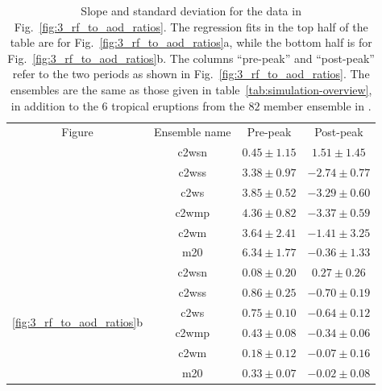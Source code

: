 \documentclass{ametsocV6.1}
\begin{document}
\begin{table}
  \centering

  \caption{Slope and standard deviation for the data in Fig.~\ref{fig:3_rf_to_aod_ratios}.
    The regression fits in the top half of the table are for
    Fig.~\ref{fig:3_rf_to_aod_ratios}a, while the bottom half is for
    Fig.~\ref{fig:3_rf_to_aod_ratios}b. The columns ``pre-peak'' and ``post-peak'' refer to
    the two periods as shown in Fig.~\ref{fig:3_rf_to_aod_ratios}. The ensembles are the
    same as those given in table~\ref{tab:simulation-overview}, in addition to the \(6\)
    tropical eruptions from the \(82\) member ensemble in
    \citet{marshall2020}.}\label{tab:slope-gradients}%
  \begin{tabular}{cccc}
    Figure                                           & Ensemble name & Pre-peak        & Post-peak        \\
    \rowcolor{LightGray}                             & \gls{c2wsn}   & \(0.45\pm1.15\) & \(1.51\pm1.45\)  \\
    \rowcolor{LightGray}                             & \gls{c2wss}   & \(3.38\pm0.97\) & \(-2.74\pm0.77\) \\
    \rowcolor{LightGray}                             & \gls{c2ws}    & \(3.85\pm0.52\) & \(-3.29\pm0.60\) \\
    \rowcolor{LightGray}                             & \gls{c2wmp}   & \(4.36\pm0.82\) & \(-3.37\pm0.59\) \\
    \rowcolor{LightGray}                             & \gls{c2wm}    & \(3.64\pm2.41\) & \(-1.41\pm3.25\) \\
    \rowcolor{LightGray}                             & \gls{m20}     & \(6.34\pm1.77\) & \(-0.36\pm1.33\) \\
    \multirow{6}{*}{\ref{fig:3_rf_to_aod_ratios}b}   & \gls{c2wsn}   & \(0.08\pm0.20\) & \(0.27\pm0.26\)  \\
    \multirow{-10}{*}{\ref{fig:3_rf_to_aod_ratios}a} & \gls{c2wss}   & \(0.86\pm0.25\) & \(-0.70\pm0.19\) \\
                                                     & \gls{c2ws}    & \(0.75\pm0.10\) & \(-0.64\pm0.12\) \\
                                                     & \gls{c2wmp}   & \(0.43\pm0.08\) & \(-0.34\pm0.06\) \\
                                                     & \gls{c2wm}    & \(0.18\pm0.12\) & \(-0.07\pm0.16\) \\
                                                     & \gls{m20}     & \(0.33\pm0.07\) & \(-0.02\pm0.08\) \\
  \end{tabular}
\end{table}
\end{document}
